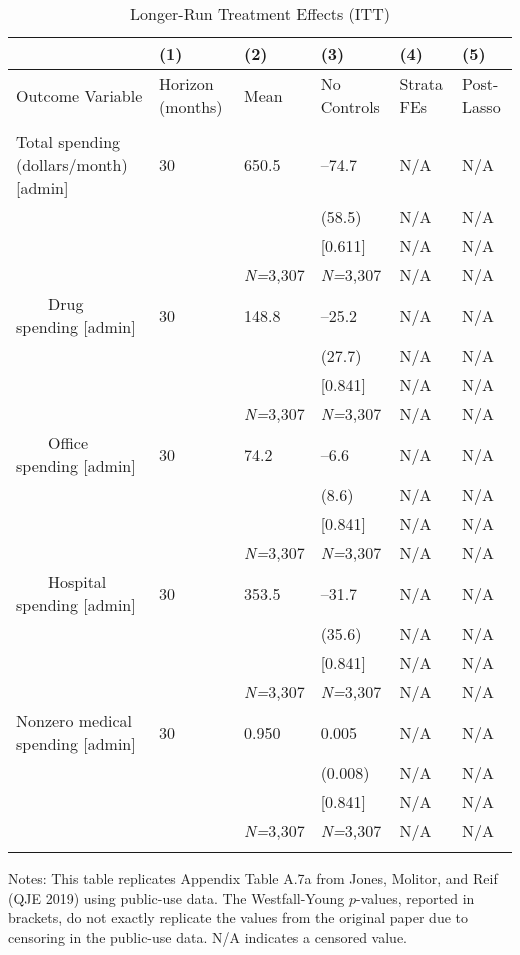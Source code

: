 \documentclass{article}
\begin{document}
\setlength{\tabcolsep}{6pt}
\begin{table}[tbp] \centering
{}

\caption{Longer-Run Treatment Effects (ITT)}
\label{tab:appendix_itt_spend_vars_admin_0816_0119}
{\scriptsize
\begin{tabularx}{\linewidth}{lCCCCC}

\toprule
&{(1)}&{(2)}&{(3)}&{(4)}&{(5)} \tabularnewline \midrule
{Outcome Variable}&{Horizon (months)}&{Mean}&{No Controls}&{Strata FEs}&{Post-Lasso} \tabularnewline
\midrule 
\addlinespace[1.4ex]
& \tabularnewline
\midrule Total spending (dollars/month) [admin]&30&650.5&--74.7&N/A&N/A \tabularnewline
&&&(58.5)&N/A&N/A \tabularnewline
&&&[0.611]&N/A&N/A \tabularnewline
&&\textit{N=}3,307&\textit{N=}3,307&N/A&N/A \tabularnewline
\addlinespace[1.4ex]
\ \ \ \ Drug spending [admin]&30&148.8&--25.2&N/A&N/A \tabularnewline
&&&(27.7)&N/A&N/A \tabularnewline
&&&[0.841]&N/A&N/A \tabularnewline
&&\textit{N=}3,307&\textit{N=}3,307&N/A&N/A \tabularnewline
\addlinespace[1.4ex]
\ \ \ \ Office spending [admin]&30&74.2&--6.6&N/A&N/A \tabularnewline
&&&(8.6)&N/A&N/A \tabularnewline
&&&[0.841]&N/A&N/A \tabularnewline
&&\textit{N=}3,307&\textit{N=}3,307&N/A&N/A \tabularnewline
\addlinespace[1.4ex]
\ \ \ \ Hospital spending [admin]&30&353.5&--31.7&N/A&N/A \tabularnewline
&&&(35.6)&N/A&N/A \tabularnewline
&&&[0.841]&N/A&N/A \tabularnewline
&&\textit{N=}3,307&\textit{N=}3,307&N/A&N/A \tabularnewline
\addlinespace[1.4ex]
Nonzero medical spending [admin]&30&0.950&0.005&N/A&N/A \tabularnewline
&&&(0.008)&N/A&N/A \tabularnewline
&&&[0.841]&N/A&N/A \tabularnewline
&&\textit{N=}3,307&\textit{N=}3,307&N/A&N/A \tabularnewline
\bottomrule\addlinespace[-1.5ex] 

\end{tabularx}
\begin{flushleft}
\footnotesize Notes: This table replicates Appendix Table A.7a from Jones, Molitor, and Reif (QJE 2019) using public-use data. The Westfall-Young \(p\)-values, reported in brackets, do not exactly replicate the values from the original paper due to censoring in the public-use data. N/A indicates a censored value.
\end{flushleft}
}
\end{table}
\end{document}
